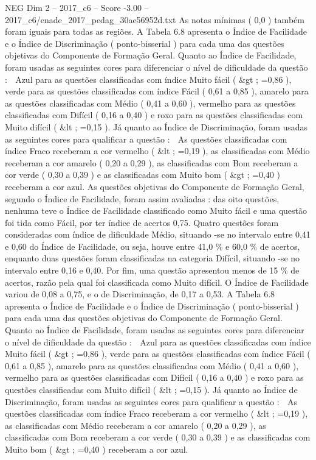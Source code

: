 \begin{textsample}{NEG Dim 2 – 2017\_c6 – Score -3.00 – 2017\_c6/enade\_2017\_pedag\_30ae56952d.txt}
As notas mínimas ( 0,0 ) também foram iguais para todas as regiões.
A Tabela 6.8 apresenta o Índice de Facilidade e o Índice de Discriminação ( ponto-bisserial ) para cada uma das questões objetivas do Componente de Formação Geral.
Quanto ao Índice de Facilidade, foram usadas as seguintes cores para diferenciar o nível de dificuldade da questão :  Azul para as questões classificadas com índice Muito fácil ( \&gt ; =0,86 ), verde para as questões classificadas com índice Fácil ( 0,61 a 0,85 ), amarelo para as questões classificadas com Médio ( 0,41 a 0,60 ), vermelho para as questões classificadas com Difícil ( 0,16 a 0,40 ) e roxo para as questões classificadas com Muito difícil ( \&lt ; =0,15 ).
Já quanto ao Índice de Discriminação, foram usadas as seguintes cores para qualificar a questão :  As questões classificadas com índice Fraco receberam a cor vermelho ( \&lt ; =0,19 ), as classificadas com Médio receberam a cor amarelo ( 0,20 a 0,29 ), as classificadas com Bom receberam a cor verde ( 0,30 a 0,39 ) e as classificadas com Muito bom ( \&gt ; =0,40 ) receberam a cor azul.
As questões objetivas do Componente de Formação Geral, segundo o Índice de Facilidade, foram assim avaliadas : das oito questões, nenhuma teve o Índice de Facilidade classificado como Muito fácil e uma questão foi tida como Fácil, por ter índice de acertos 0,75.
Quatro questões foram consideradas com índice de dificuldade Médio, situando -se no intervalo entre 0,41 e 0,60 do Índice de Facilidade, ou seja, houve entre 41,0 \% e 60,0 \% de acertos, enquanto duas questões foram classificadas na categoria Difícil, situando -se no intervalo entre 0,16 e 0,40.
Por fim, uma questão apresentou menos de 15 \% de acertos, razão pela qual foi classificada como Muito difícil.
O Índice de Facilidade variou de 0,08 a 0,75, e o de Discriminação, de 0,17 a 0,53.
A Tabela 6.8 apresenta o Índice de Facilidade e o Índice de Discriminação ( ponto-bisserial ) para cada uma das questões objetivas do Componente de Formação Geral.
Quanto ao Índice de Facilidade, foram usadas as seguintes cores para diferenciar o nível de dificuldade da questão :  Azul para as questões classificadas com índice Muito fácil ( \&gt ; =0,86 ), verde para as questões classificadas com índice Fácil ( 0,61 a 0,85 ), amarelo para as questões classificadas com Médio ( 0,41 a 0,60 ), vermelho para as questões classificadas com Difícil ( 0,16 a 0,40 ) e roxo para as questões classificadas com Muito difícil ( \&lt ; =0,15 ).
Já quanto ao Índice de Discriminação, foram usadas as seguintes cores para qualificar a questão :  As questões classificadas com índice Fraco receberam a cor vermelho ( \&lt ; =0,19 ), as classificadas com Médio receberam a cor amarelo ( 0,20 a 0,29 ), as classificadas com Bom receberam a cor verde ( 0,30 a 0,39 ) e as classificadas com Muito bom ( \&gt ; =0,40 ) receberam a cor azul.

\end{textsample}
